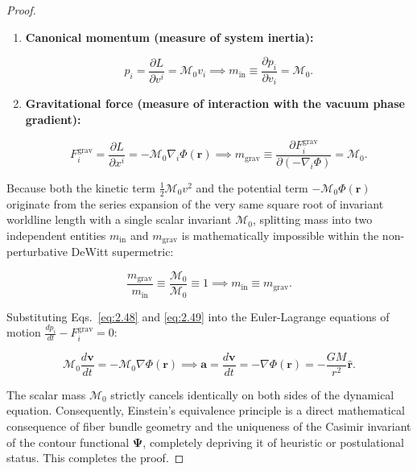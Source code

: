 \begin{proof}
\begin{enumerate}
\item \textbf{Canonical momentum (measure of system inertia):}

\begin{equation}\label{eq:2.48}\label{eq:2.98}\tag{2.48}
p_i = \frac{\partial L}{\partial v^i} = \mathcal{M}_0 v_i \implies m_{\text{in}} \equiv \frac{\partial p_i}{\partial v_i} = \mathcal{M}_0.
\end{equation}

\item \textbf{Gravitational force (measure of interaction with the vacuum phase gradient):}

\begin{equation}\label{eq:2.49}\label{eq:2.99}\tag{2.49}
F_i^{\text{grav}} = \frac{\partial L}{\partial x^i} = -\mathcal{M}_0 \nabla_i \Phi(\mathbf{r}) \implies m_{\text{grav}} \equiv \frac{\partial F_i^{\text{grav}}}{\partial (-\nabla_i \Phi)} = \mathcal{M}_0.
\end{equation}
\end{enumerate}

Because both the kinetic term $\frac{1}{2}\mathcal{M}_0 v^2$ and the potential term $-\mathcal{M}_0 \Phi(\mathbf{r})$ originate from the series expansion of the very same square root of invariant worldline length with a single scalar invariant $\mathcal{M}_0$, splitting mass into two independent entities $m_{\text{in}}$ and $m_{\text{grav}}$ is mathematically impossible within the non-perturbative DeWitt supermetric:

\begin{equation}\label{eq:2.50}\label{eq:2.100}\tag{2.50}
\frac{m_{\text{grav}}}{m_{\text{in}}} \equiv \frac{\mathcal{M}_0}{\mathcal{M}_0} \equiv 1 \implies m_{\text{in}} \equiv m_{\text{grav}}.
\end{equation}

Substituting Eqs.~\eqref{eq:2.48} and \eqref{eq:2.49} into the Euler-Lagrange equations of motion $\frac{d p_i}{dt} - F_i^{\text{grav}} = 0$:

\begin{equation}\label{eq:2.51}\label{eq:2.101}\tag{2.51}
\mathcal{M}_0 \frac{d\mathbf{v}}{dt} = -\mathcal{M}_0 \nabla \Phi(\mathbf{r}) \implies \mathbf{a} = \frac{d\mathbf{v}}{dt} = -\nabla\Phi(\mathbf{r}) = -\frac{GM}{r^2}\hat{\mathbf{r}}.
\end{equation}

The scalar mass $\mathcal{M}_0$ strictly cancels identically on both sides of the dynamical equation. Consequently, Einstein's equivalence principle is a direct mathematical consequence of fiber bundle geometry and the uniqueness of the Casimir invariant of the contour functional $\mathbf{\Psi}$, completely depriving it of heuristic or postulational status. This completes the proof.
\end{proof}

